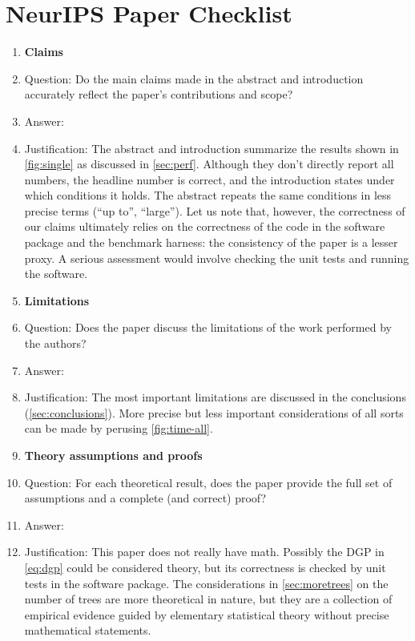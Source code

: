 \section*{NeurIPS Paper Checklist}

\begin{enumerate}

	\item {\bf Claims}
	\item[] Question: Do the main claims made in the abstract and introduction accurately reflect the paper's contributions and scope?
	\item[] Answer: \answerYes{} %
	\item[] Justification: The abstract and introduction summarize the results
	      shown in \autoref{fig:single} as discussed in \autoref{sec:perf}. Although
	      they don't directly report all numbers, the headline number is correct, and
	      the introduction states under which conditions it holds. The abstract
	      repeats the same conditions in less precise terms (``up to'', ``large'').
	      Let us note that, however, the correctness of our claims ultimately
	      relies on the correctness of the code in the software package and the benchmark harness:
	      the consistency of the paper is a lesser proxy. A serious assessment would
	      involve checking the unit tests and running the software.

	\item {\bf Limitations}
	\item[] Question: Does the paper discuss the limitations of the work performed by the authors?
	\item[] Answer: \answerYes{} %
	\item[] Justification: The most important limitations are discussed in the conclusions (\autoref{sec:conclusions}). More precise but less important considerations of all sorts can be made by perusing \autoref{fig:time-all}.

	\item {\bf Theory assumptions and proofs}
	\item[] Question: For each theoretical result, does the paper provide the full set of assumptions and a complete (and correct) proof?
	\item[] Answer: \answerNA{} %
	\item[] Justification: This paper does not really have math. Possibly the DGP in \autoref{eq:dgp} could be considered theory, but its correctness is checked by unit tests in the software package. The considerations in \autoref{sec:moretrees} on the number of trees are more theoretical in nature, but they are a collection of empirical evidence guided by elementary statistical theory without precise mathematical statements.


\end{enumerate}
